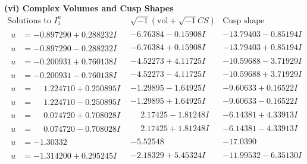 \documentclass[1p]{elsarticle_modified}
\theoremstyle{definition}
\newcommand{\I}{\sqrt{-1}}
\begin{document}
\newpage\flushleft \textbf{(vi) Complex Volumes and Cusp Shapes}
$$\begin{array}{c|c|c}  
\text{Solutions to }I^u_{1}& \I (\text{vol} + \sqrt{-1}CS) & \text{Cusp shape}\\
 \hline 
\begin{aligned}
u &= -0.897290 + 0.288232 I\end{aligned}
 & -6.76384 - 0.15908 I & -13.79403 - 0.85194 I \\ \hline\begin{aligned}
u &= -0.897290 - 0.288232 I\end{aligned}
 & -6.76384 + 0.15908 I & -13.79403 + 0.85194 I \\ \hline\begin{aligned}
u &= -0.200931 + 0.760138 I\end{aligned}
 & -4.52273 + 4.11725 I & -10.59688 - 3.71929 I \\ \hline\begin{aligned}
u &= -0.200931 - 0.760138 I\end{aligned}
 & -4.52273 - 4.11725 I & -10.59688 + 3.71929 I \\ \hline\begin{aligned}
u &= \phantom{-}1.224710 + 0.250895 I\end{aligned}
 & -1.29895 - 1.64925 I & -9.60633 + 0.16522 I \\ \hline\begin{aligned}
u &= \phantom{-}1.224710 - 0.250895 I\end{aligned}
 & -1.29895 + 1.64925 I & -9.60633 - 0.16522 I \\ \hline\begin{aligned}
u &= \phantom{-}0.074720 + 0.708028 I\end{aligned}
 & \phantom{-}2.17425 - 1.81248 I & -6.14381 + 4.33913 I \\ \hline\begin{aligned}
u &= \phantom{-}0.074720 - 0.708028 I\end{aligned}
 & \phantom{-}2.17425 + 1.81248 I & -6.14381 - 4.33913 I \\ \hline\begin{aligned}
u &= -1.30332\phantom{ +0.000000I}\end{aligned}
 & -5.52548\phantom{ +0.000000I} & -17.0390\phantom{ +0.000000I} \\ \hline\begin{aligned}
u &= -1.314200 + 0.295245 I\end{aligned}
 & -2.18329 + 5.45324 I & -11.99532 - 6.35130 I \\ \hline\begin{aligned}

\end{aligned}
\end{array}$$
\end{document}
